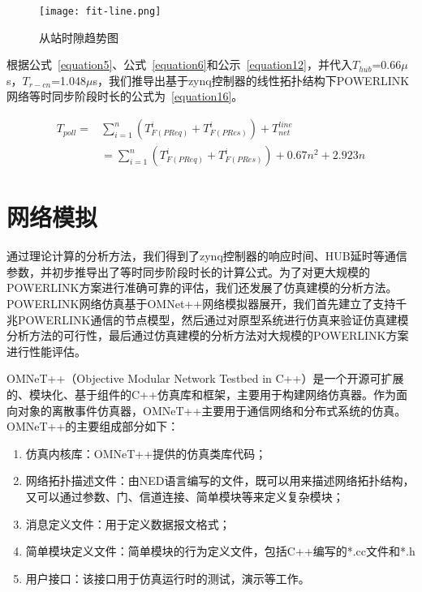 \begin{figure}[!htb]
  \centering
  \texttt{[image: fit-line.png]}
  \caption{从站时隙趋势图}
  \label{fig:fit-line}
\end{figure}

根据公式~\ref{equation5}、公式~\ref{equation6}和公示~\ref{equation12}，并代入$T_{hub}$=0.66$\mu$s，$T_{r-cn}$=1.048$\mu$s，我们推导出基于zynq控制器的线性拓扑结构下POWERLINK网络等时同步阶段时长的公式为~\ref{equation16}。

\begin{equation}
\begin{split}
\label{equation16}
T_{poll}=&\sum_{i=1}^n(T_{F(PReq)}^{i}+T_{F(PRes)}^{i})+T_{net}^{line}\\
&=\sum_{i=1}^n(T_{F(PReq)}^{i}+T_{F(PRes)}^{i})+0.67n^{2}+2.923n
\end{split}
\end{equation}

\section{网络模拟}
通过理论计算的分析方法，我们得到了zynq控制器的响应时间、HUB延时等通信参数，并初步推导出了等时同步阶段时长的计算公式。为了对更大规模的POWERLINK方案进行准确可靠的评估，我们还发展了仿真建模的分析方法。POWERLINK网络仿真基于OMNet++网络模拟器展开，我们首先建立了支持千兆POWERLINK通信的节点模型，然后通过对原型系统进行仿真来验证仿真建模分析方法的可行性，最后通过仿真建模的分析方法对大规模的POWERLINK方案进行性能评估。

OMNeT++（Objective Modular Network Testbed in C++）是一个开源可扩展的、模块化、基于组件的C++仿真库和框架，主要用于构建网络仿真器。作为面向对象的离散事件仿真器，OMNeT++主要用于通信网络和分布式系统的仿真。OMNeT++的主要组成部分如下：

\begin{enumerate}
  \item 仿真内核库：OMNeT++提供的仿真类库代码；
  \item 网络拓扑描述文件：由NED语言编写的文件，既可以用来描述网络拓扑结构，又可以通过参数、门、信道连接、简单模块等来定义复杂模块；
  \item 消息定义文件：用于定义数据报文格式；
  \item 简单模块定义文件：简单模块的行为定义文件，包括C++编写的*.cc文件和*.h
  \item 用户接口：该接口用于仿真运行时的测试，演示等工作。
\end{enumerate}

